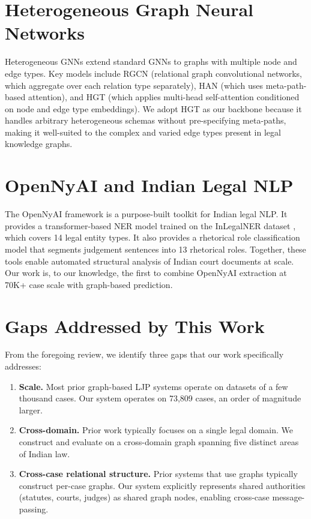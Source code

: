 \documentclass[12pt,a4paper]{report}
\begin{document}
\section{Heterogeneous Graph Neural Networks}

Heterogeneous GNNs extend standard GNNs to graphs with multiple node and edge types. Key models include RGCN \citep{schlichtkrull2018modeling} (relational graph convolutional networks, which aggregate over each relation type separately), HAN \citep{wang2019heterogeneous} (which uses meta-path-based attention), and HGT \citep{hu2020heterogeneous} (which applies multi-head self-attention conditioned on node and edge type embeddings). We adopt HGT as our backbone because it handles arbitrary heterogeneous schemas without pre-specifying meta-paths, making it well-suited to the complex and varied edge types present in legal knowledge graphs.

\section{OpenNyAI and Indian Legal NLP}

The OpenNyAI framework \citep{opennyai2022} is a purpose-built toolkit for Indian legal NLP. It provides a transformer-based NER model trained on the InLegalNER dataset \citep{kalamkar2022named}, which covers 14 legal entity types. It also provides a rhetorical role classification model that segments judgement sentences into 13 rhetorical roles. Together, these tools enable automated structural analysis of Indian court documents at scale. Our work is, to our knowledge, the first to combine OpenNyAI extraction at 70K+ case scale with graph-based prediction.

\section{Gaps Addressed by This Work}

From the foregoing review, we identify three gaps that our work specifically addresses:

\begin{enumerate}
  \item \textbf{Scale.} Most prior graph-based LJP systems operate on datasets of a few thousand cases. Our system operates on 73,809 cases, an order of magnitude larger.
  \item \textbf{Cross-domain.} Prior work typically focuses on a single legal domain. We construct and evaluate on a cross-domain graph spanning five distinct areas of Indian law.
  \item \textbf{Cross-case relational structure.} Prior systems that use graphs typically construct per-case graphs. Our system explicitly represents shared authorities (statutes, courts, judges) as shared graph nodes, enabling cross-case message-passing.
\end{enumerate}
\end{document}
